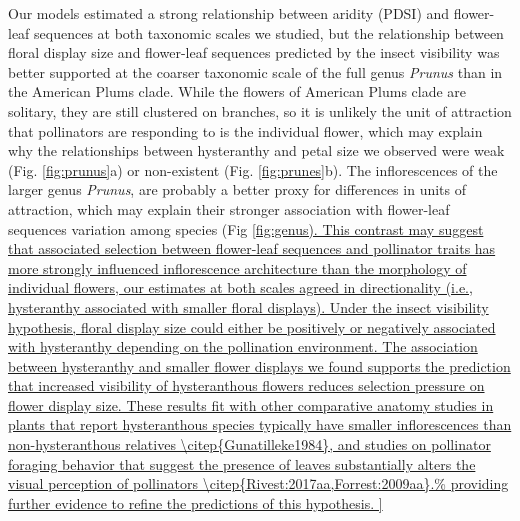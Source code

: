 \documentclass{article}[12pt]
\begin{document}
{Our models estimated a strong relationship between aridity (PDSI) and flower-leaf sequences at both taxonomic scales we studied, but the relationship between floral display size and flower-leaf sequences predicted by the insect visibility was better supported at the coarser taxonomic scale of the full genus \emph{Prunus} than in the American Plums clade. While the flowers of American Plums clade are solitary, they are still clustered on branches, so it is unlikely the unit of attraction that pollinators are responding to is the individual flower, which may explain why the relationships between hysteranthy and petal size we observed were weak (Fig. \ref{fig:prunus}a) or non-existent (Fig. \ref{fig:prunes}b). The inflorescences of the larger genus \emph{Prunus}, are probably a better proxy for differences in units of attraction, which may explain their stronger association with flower-leaf sequences variation among species (Fig \ref{fig:genus). This contrast may suggest that associated selection between flower-leaf sequences and pollinator traits has more strongly influenced inflorescence architecture than the morphology of individual flowers, our estimates at both scales agreed in directionality (i.e., hysteranthy associated with smaller floral displays). 

Under the insect visibility hypothesis, floral display size could either be positively or negatively associated with hysteranthy depending on the pollination environment. The association between hysteranthy and smaller flower displays we found supports the prediction that increased visibility of hysteranthous flowers reduces selection pressure on flower display size. These results fit with other comparative anatomy studies in plants that report hysteranthous species typically have smaller inflorescences than non-hysteranthous relatives \citep{Gunatilleke1984}, and studies on pollinator foraging behavior that suggest the presence of leaves substantially alters the visual perception of pollinators \citep{Rivest:2017aa,Forrest:2009aa}.%

}}
\end{document}
